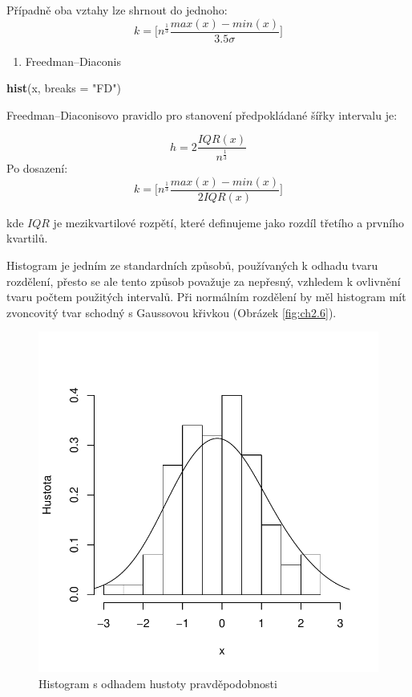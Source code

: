 \documentclass[12pt,]{article}
\newenvironment{Shaded}{\begin{snugshade}}{\end{snugshade}}
\newcommand{\KeywordTok}[1]{\textcolor[rgb]{0.13,0.29,0.53}{\textbf{#1}}}
\newcommand{\DataTypeTok}[1]{\textcolor[rgb]{0.13,0.29,0.53}{#1}}
\newcommand{\StringTok}[1]{\textcolor[rgb]{0.31,0.60,0.02}{#1}}
\newcommand{\NormalTok}[1]{#1}
\providecommand{\tightlist}{%
  \setlength{\itemsep}{0pt}\setlength{\parskip}{0pt}}
\begin{document}
Případně oba vztahy lze shrnout do jednoho:
\[k = \Big[n^{\frac{1}{3}}{\frac{max(x)-min(x)}{3.5 \sigma}}\Big]\]

\begin{enumerate}
\def\labelenumi{\arabic{enumi}.}
\setcounter{enumi}{2}
\tightlist
\item
  Freedman--Diaconis
\end{enumerate}

\begin{Shaded}
\begin{Highlighting}[]
\KeywordTok{hist}\NormalTok{(x, }\DataTypeTok{breaks =} \StringTok{"FD"}\NormalTok{)}
\end{Highlighting}
\end{Shaded}

Freedman--Diaconisovo pravidlo pro stanovení předpokládané šířky
intervalu je:

\[h=2\frac{IQR(x)}{n^{\frac{1}{3}}}\] Po dosazení:
\[k = \Big[n^{\frac{1}{3}}{\frac{max(x)-min(x)}{2IQR(x)}}\Big]\]

kde \(IQR\) je mezikvartilové rozpětí, které definujeme jako rozdíl
třetího a prvního kvartilů.

Histogram je jedním ze standardních způsobů, používaných k odhadu tvaru
rozdělení, přesto se ale tento způsob považuje za nepřesný, vzhledem k
ovlivnění tvaru počtem použitých intervalů. Při normálním rozdělení by
měl histogram mít zvoncovitý tvar schodný s Gaussovou křivkou (Obrázek
\ref{fig:ch2.6}).

\begin{figure}[H]

{\centering \includegraphics[width=0.6\linewidth]{BP_files/figure-latex/hist_example-1} 

}

\caption{\label{fig:ch2.6} Histogram s odhadem hustoty pravděpodobnosti}\label{fig:hist_example}
\end{figure}
\end{document}

